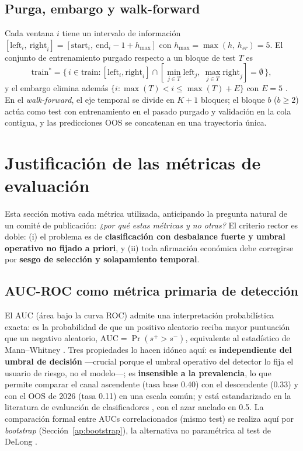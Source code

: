 \documentclass[11pt,a4paper]{article}
\begin{document}
\subsection{Purga, embargo y walk-forward}
Cada ventana $i$ tiene un intervalo de información
$[\mathrm{left}_i,\ \mathrm{right}_i] = [\mathrm{start}_i,\ \mathrm{end}_i - 1 +
h_{\max}]$ con $h_{\max}=\max(h,\,h_{sr})=5$. El conjunto de entrenamiento purgado
respecto a un bloque de test $T$ es
\begin{equation}
\mathrm{train}^{*} = \{\, i \in \mathrm{train} :
[\mathrm{left}_i,\mathrm{right}_i] \cap
[\min_{j\in T}\mathrm{left}_j,\ \max_{j\in T}\mathrm{right}_j] = \emptyset \,\},
\end{equation}
y el embargo elimina además $\{i : \max(T) < i \leq \max(T)+E\}$ con $E=5$
\cite{lopezdeprado2018advances}. En el \emph{walk-forward}, el eje temporal se
divide en $K{+}1$ bloques; el bloque $b$ ($b\geq 2$) actúa como test con
entrenamiento en el pasado purgado y validación en la cola contigua, y las
predicciones OOS se concatenan en una trayectoria única.

\section{Justificación de las métricas de evaluación}
\label{ap:metricas}
Esta sección motiva cada métrica utilizada, anticipando la pregunta natural de
un comité de publicación: \emph{¿por qué estas métricas y no otras?} El criterio
rector es doble: (i) el problema es de \textbf{clasificación con desbalance
fuerte y umbral operativo no fijado a priori}, y (ii) toda afirmación económica
debe corregirse por \textbf{sesgo de selección y solapamiento temporal}.

\subsection{AUC-ROC como métrica primaria de detección}
El AUC (área bajo la curva ROC) admite una interpretación probabilística exacta:
es la probabilidad de que un positivo aleatorio reciba mayor puntuación que un
negativo aleatorio, $\mathrm{AUC} = \Pr(s^{+} > s^{-})$, equivalente al
estadístico de Mann--Whitney \cite{hanley1982meaning}. Tres propiedades lo hacen
idóneo aquí: es \textbf{independiente del umbral de decisión} —crucial porque el
umbral operativo del detector lo fija el usuario de riesgo, no el modelo—; es
\textbf{insensible a la prevalencia}, lo que permite comparar el canal
ascendente (tasa base 0.40) con el descendente (0.33) y con el OOS de 2026 (tasa
0.11) en una escala común; y está estandarizado en la literatura de evaluación de
clasificadores \cite{bradley1997use,fawcett2006introduction}, con el azar
anclado en 0.5. La comparación formal entre AUCs correlacionados (mismo test)
se realiza aquí por \emph{bootstrap} (Sección~\ref{ap:bootstrap}), la
alternativa no paramétrica al test de DeLong \cite{delong1988comparing}.
\end{document}

